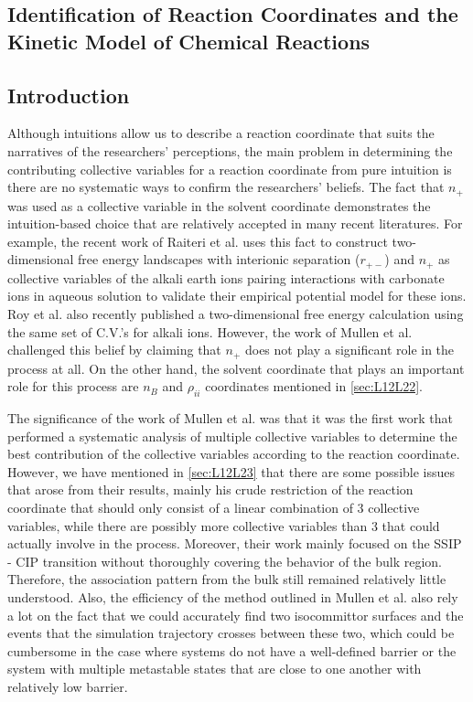 \begin{spacing}{2.0}
    \chapter{Identification of Reaction Coordinates and the Kinetic Model of Chemical Reactions}

    \section{Introduction}

    Although intuitions allow us to describe a reaction coordinate that suits the narratives of the researchers' perceptions, the main problem in 
    determining the contributing collective variables for a reaction coordinate from pure intuition is there are no systematic ways to confirm the 
    researchers' beliefs. The fact that $n_+$ was used as a collective variable in the solvent coordinate demonstrates the intuition-based choice 
    that are relatively accepted in many recent literatures. For example, the recent work of Raiteri et al. uses this fact to construct 
    two-dimensional free energy landscapes with interionic separation ($r_{+-}$) and $n_+$ as collective variables of the alkali earth ions pairing 
    interactions with carbonate ions in aqueous solution to validate their empirical potential model for these ions. \cite{P-JPhysChemC-2015-v43-Raiteri} 
    Roy et al. also recently published a two-dimensional free energy calculation using the same set of C.V.'s for alkali ions. 
    \cite{P-JPhysChemC-2016-v120-Roy, P-JCTC-2017-v13-Roy} However, the work of Mullen et al. 
    challenged this belief by claiming that $n_+$  does not play a significant role in the process at all. On the other hand, the solvent coordinate 
    that plays an important role for this process are $n_B$ and $\rho_{ii}$ coordinates mentioned in \ref{sec:L12L22}. \cite{P-JCTC-2014-v10-Mullen}

    The significance of the work of Mullen et al. was that it was the first work that performed a systematic analysis of multiple collective variables 
    to determine the best contribution of the collective variables according to the reaction coordinate. However, we have mentioned in \ref{sec:L12L23} 
    that there are some possible issues that arose from their results, mainly his crude restriction of the reaction coordinate that should only 
    consist of a linear combination of 3 collective variables, while there are possibly more collective variables than 3 that could actually involve 
    in the process. Moreover, their work mainly focused on the SSIP - CIP transition without thoroughly covering the behavior of the bulk region. 
    Therefore, the association pattern from the bulk still remained relatively little understood. Also, the efficiency of the method outlined in 
    Mullen et al. also rely a lot on the fact that we could accurately find two isocommittor surfaces and the events that the simulation trajectory 
    crosses between these two, which could be cumbersome in the case where systems do not have a well-defined barrier or the system with multiple 
    metastable states that are close to one another with relatively low barrier.


\end{spacing}
